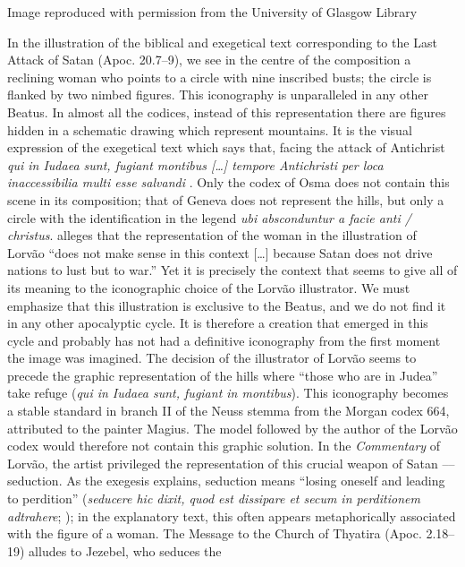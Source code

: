 \documentclass{article}
\begin{document}
 Image reproduced with permission from the University of Glasgow Library 


 
In the illustration of the
biblical and exegetical text corresponding to the Last Attack of Satan
(Apoc. 20.7--9), we see in the centre of the composition a reclining
woman who points to a circle with nine inscribed busts; the circle is
flanked by two nimbed figures. This iconography is unparalleled in any
other Beatus. In almost all the codices, instead of this representation
there are figures hidden in a schematic drawing which represent
mountains. It is the visual expression of the exegetical text which says
that, facing the attack of Antichrist \emph{qui in Iudaea sunt, fugiant
montibus [\ldots] tempore Antichristi per loca inaccessibilia multi
esse salvandi} \citep[622]{gonzalez_echegaray_obras_1995}. Only the codex of
Osma does not contain this scene in its composition; that of Geneva does
not represent the hills, but only a circle with the identification in
the legend \emph{ubi absconduntur a facie anti / christus}. \citet[126]{klein_beato_2004} alleges that the representation of the woman in the illustration of
Lorvão ``does not make sense in this context [\ldots] because Satan
does not drive nations to lust but to war.'' Yet it is precisely the
context that seems to give all of its meaning to the iconographic choice
of the Lorvão illustrator. We must emphasize that this illustration is
exclusive to the Beatus, and we do not find it in any other apocalyptic
cycle. It is therefore a creation that emerged in this cycle and
probably has not had a definitive iconography from the first moment the
image was imagined. The decision of the illustrator of Lorvão seems to
precede the graphic representation of the hills where ``those who are in
Judea'' take refuge (\emph{qui in Iudaea sunt, fugiant in montibus}).
This iconography becomes a stable standard in branch II of the Neuss
stemma from the Morgan codex 664, attributed to the painter
Magius. The model followed by the author of the Lorvão codex would
therefore not contain this graphic solution. In the \emph{Commentary} of
Lorvão, the artist privileged the representation of this crucial weapon
of Satan –– seduction. As the exegesis explains, seduction means
``losing oneself and leading to perdition'' (\emph{seducere hic dixit,
quod est dissipare et secum in perditionem adtrahere}; \citealt[620]{gonzalez_echegaray_obras_1995}); in the explanatory text, this often appears
metaphorically associated with the figure of a woman. The Message to the
Church of Thyatira (Apoc. 2.18--19) alludes to Jezebel, who seduces the
\end{document}
